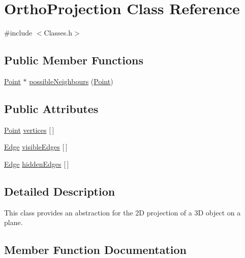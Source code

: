 \hypertarget{class_ortho_projection}{}\section{Ortho\+Projection Class Reference}
\label{class_ortho_projection}


{\ttfamily \#include $<$Classes.\+h$>$}

\subsection*{Public Member Functions}
\begin{DoxyCompactItemize}
\item 
\hyperlink{class_point}{Point} $\ast$ \hyperlink{class_ortho_projection_aa0634b80a904634451f03a11db28c33d}{possible\+Neighbours} (\hyperlink{class_point}{Point})
\end{DoxyCompactItemize}
\subsection*{Public Attributes}
\begin{DoxyCompactItemize}
\item 
\hyperlink{class_point}{Point} \hyperlink{class_ortho_projection_a66b7e72014671cf35f4c6728b7baeec6}{vertices} \mbox{[}$\,$\mbox{]}
\item 
\hyperlink{class_edge}{Edge} \hyperlink{class_ortho_projection_a8903896a5a8facc50585ea50584617a1}{visible\+Edges} \mbox{[}$\,$\mbox{]}
\item 
\hyperlink{class_edge}{Edge} \hyperlink{class_ortho_projection_af5ebfefeb5cbc7ba0373697161ce27da}{hidden\+Edges} \mbox{[}$\,$\mbox{]}
\end{DoxyCompactItemize}


\subsection{Detailed Description}
This class provides an abstraction for the 2D projection of a 3D object on a plane. 

\subsection{Member Function Documentation}
